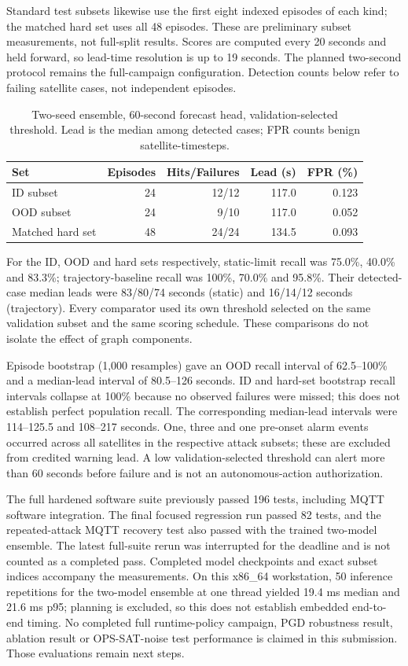 \documentclass[10pt,a4paper,twocolumn]{article}
\begin{document}
Standard test subsets likewise use the first eight indexed episodes of each kind; the matched hard set uses all 48 episodes. These are preliminary subset measurements, not full-split results. Scores are computed every 20 seconds and held forward, so lead-time resolution is up to 19 seconds. The planned two-second protocol remains the full-campaign configuration. Detection counts below refer to failing satellite cases, not independent episodes.

\begin{table}[ht]
\centering\footnotesize\setlength{\tabcolsep}{3pt}
\begin{tabular}{lrrrr}
\toprule
Set & Episodes & Hits/Failures & Lead (s) & FPR (\%)\\
\midrule
ID subset & 24 & 12/12 & 117.0 & 0.123 \\
OOD subset & 24 & 9/10 & 117.0 & 0.052 \\
Matched hard set & 48 & 24/24 & 134.5 & 0.093 \\
\bottomrule
\end{tabular}
\caption{Two-seed ensemble, 60-second forecast head, validation-selected threshold. Lead is the median among detected cases; FPR counts benign satellite-timesteps.}
\end{table}

For the ID, OOD and hard sets respectively, static-limit recall was 75.0\%, 40.0\% and 83.3\%; trajectory-baseline recall was 100\%, 70.0\% and 95.8\%. Their detected-case median leads were 83/80/74 seconds (static) and 16/14/12 seconds (trajectory). Every comparator used its own threshold selected on the same validation subset and the same scoring schedule. These comparisons do not isolate the effect of graph components.

Episode bootstrap (1,000 resamples) gave an OOD recall interval of 62.5--100\% and a median-lead interval of 80.5--126 seconds. ID and hard-set bootstrap recall intervals collapse at 100\% because no observed failures were missed; this does not establish perfect population recall. The corresponding median-lead intervals were 114--125.5 and 108--217 seconds. One, three and one pre-onset alarm events occurred across all satellites in the respective attack subsets; these are excluded from credited warning lead. A low validation-selected threshold can alert more than 60 seconds before failure and is not an autonomous-action authorization.

The full hardened software suite previously passed 196 tests, including MQTT software integration. The final focused regression run passed 82 tests, and the repeated-attack MQTT recovery test also passed with the trained two-model ensemble. The latest full-suite rerun was interrupted for the deadline and is not counted as a completed pass. Completed model checkpoints and exact subset indices accompany the measurements. On this x86\_64 workstation, 50 inference repetitions for the two-model ensemble at one thread yielded 19.4 ms median and 21.6 ms p95; planning is excluded, so this does not establish embedded end-to-end timing. No completed full runtime-policy campaign, PGD robustness result, ablation result or OPS-SAT-noise test performance is claimed in this submission. Those evaluations remain next steps.
\end{document}
